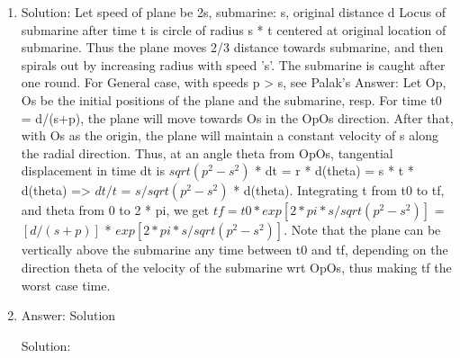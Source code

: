 \begin{enumerate}
\item
Solution: Let speed of plane be 2s, submarine: s, original distance d
Locus of submarine after time t is circle of radius s * t centered at original location of submarine. Thus the plane moves 2/3 distance towards submarine, and then spirals out by increasing radius with speed 's'. The submarine is caught after one round.
For General case, with speeds p > s, see Palak's Answer:
Let Op, Os be the initial positions of the plane and the submarine, resp. For time t0 = d/(s+p), the plane will move towards Os in the OpOs direction. After that, with Os as the origin, the plane will maintain a constant velocity of s along the radial direction. Thus, at an angle theta from OpOs, tangential displacement in time dt is $sqrt(p^2-s^2)$ * dt = r * d(theta) = s * t * d(theta) => $dt/t$ = $s/sqrt(p^2-s^2)$ * d(theta). Integrating t from t0 to tf, and theta from 0 to 2 * pi, we get $tf = t0 * exp[2 * pi * s/sqrt(p^2-s^2)]$ = $[d/(s+p)]$ * $exp[2 * pi * s/sqrt(p^2-s^2)]$.
Note that the plane can be vertically above the submarine any time between t0 and tf, depending on the direction theta of the velocity of the submarine wrt OpOs, thus making tf the worst case time.




\item
Answer: Solution
 
Solution: 





\end{enumerate}
